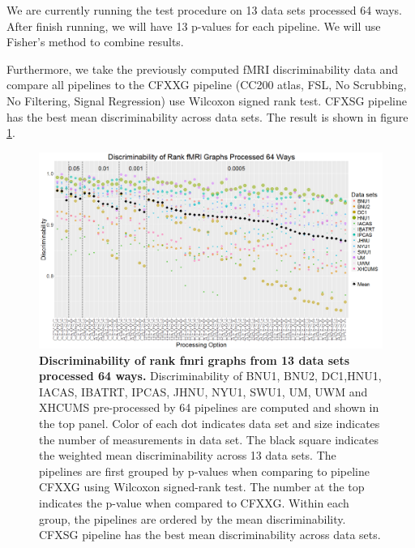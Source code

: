 \documentclass[simplex.tex]{subfiles}
\begin{document}
We are currently running the test procedure on 13 data sets
processed 64 ways. After finish running, we will have 13 p-values
for each pipeline. We will use Fisher’s method to combine
results.  


Furthermore, we take the previously computed fMRI
discriminability data and compare all pipelines to the CFXXG
pipeline (CC200 atlas, FSL, No Scrubbing, No Filtering, Signal
Regression) use Wilcoxon signed rank test. CFXSG pipeline has the
best mean discriminability across data sets. The result is shown
in figure \ref{fig:pipes}.


\begin{figure}[h!]
\begin{cframed}
\centering
\includegraphics[width=\textwidth]{./figs/pipes.png}
\caption{
{\bf Discriminability of rank fmri graphs from 13 data sets processed 64 ways.}  Discriminability of BNU1, BNU2, DC1,HNU1, IACAS, IBATRT, IPCAS, JHNU, NYU1, SWU1, UM, UWM and XHCUMS pre-processed by 64 pipelines are computed and shown in the top panel. Color of each dot indicates data set and size indicates the number of measurements in data set. The black square indicates the weighted mean discriminability across 13 data sets. The pipelines are first grouped by p-values when comparing to pipeline CFXXG using Wilcoxon signed-rank test. The number at the top indicates the p-value when compared to CFXXG. Within each group, the pipelines are ordered by the mean discriminability. CFXSG pipeline has the best mean discriminability across data sets.}
\label{fig:pipes}
\end{cframed}
\end{figure}
\end{document}
